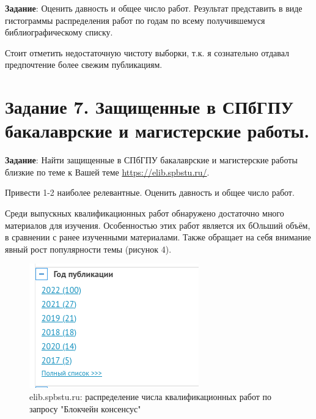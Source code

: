 \documentclass[a4paper, 12pt]{report}		%
\begin{document}
\textbf{Задание}: Оценить давность и общее число работ. Результат представить в виде гистограммы распределения работ по годам по всему получившемуся библиографическому списку.


\begin{center}
\end{center}


Стоит отметить недостаточную чистоту выборки, т.к. я сознательно отдавал предпочтение более свежим публикациям.


\chapter*{Задание 7. Защищенные в СПбГПУ бакалаврские и магистерские работы.}


\textbf{Задание}: Найти защищенные в СПбГПУ бакалаврские и магистерские работы близкие по теме к Вашей теме \url{https://elib.spbstu.ru/}.


Привести 1-2 наиболее релевантные. Оценить давность и общее число работ.


\vspace{1cm}


Среди выпускных квалификационных работ обнаружено достаточно много материалов для изучения. Особенностью этих работ является их бОльший объём, в сравнении с ранее изученными материалами. Также обращает на себя внимание явный рост популярности темы (рисунок 4).


\begin{figure}[H]
 \centering
 \includegraphics[scale=0.6]{res/elib}
 \caption{elib.spbstu.ru: распределение числа квалификационных работ по запросу "Блокчейн консенсус"}
\end{figure}
\end{document}
